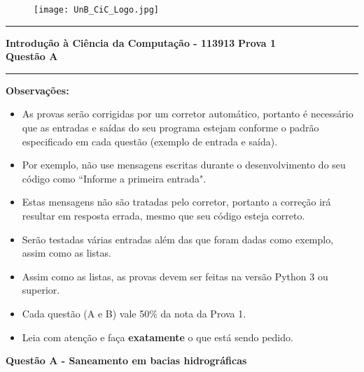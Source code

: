 \documentclass[a4paper, 12pt]{article}
\begin{document}
\begin{figure}[H]
	\texttt{[image: UnB\_CiC\_Logo.jpg]}
\end{figure}
\noindent\rule{\textwidth}{0.4pt}
\begin{center}
	\textbf{{\Large Introdução à Ciência da Computação - 113913}} \newline \newline
	\textbf{{\large Prova 1} \\
	\vspace{9pt}
	{\large Questão A}} \\
	\noindent\rule{\textwidth}{0.4pt}
	\newline
\end{center}

\textbf{{\large Observações:}}
\begin{itemize}
	\item As provas serão corrigidas por um corretor automático, portanto é necessário que as entradas e saídas do seu programa estejam conforme o padrão especificado em cada questão (exemplo de entrada e saída).
	\item Por exemplo, não use mensagens escritas durante o desenvolvimento do seu código como “Informe a primeira entrada".
	\item Estas mensagens não são tratadas pelo corretor, portanto a correção irá resultar em resposta errada, mesmo que seu código esteja correto.
	\item Serão testadas várias entradas além das que foram dadas como exemplo, assim como as listas.
	\item Assim como as listas, as provas devem ser feitas na versão Python 3 ou superior.
	\item Cada questão (A e B) vale 50\% da nota da Prova 1.
	\item Leia com atenção e faça \textbf{exatamente} o que está sendo pedido.


\end{itemize}
\newpage %
\begin{center}
\textbf{{\Large Questão A - Saneamento em bacias hidrográficas}}
\end{center}
\end{document}
